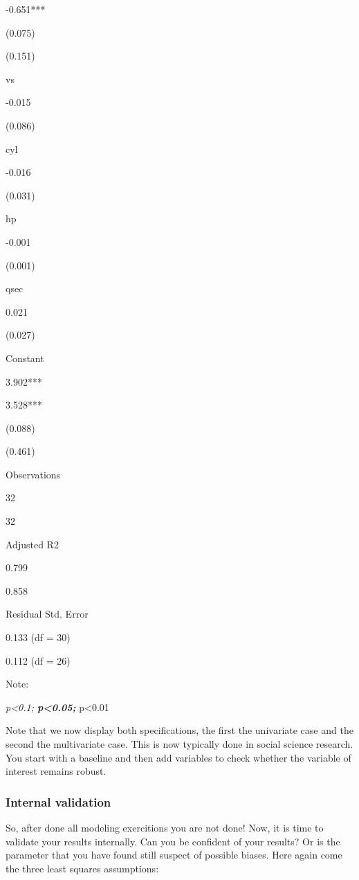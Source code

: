 \documentclass[]{article}
\begin{document}
-0.651***

(0.075)

(0.151)

vs

-0.015

(0.086)

cyl

-0.016

(0.031)

hp

-0.001

(0.001)

qsec

0.021

(0.027)

Constant

3.902***

3.528***

(0.088)

(0.461)

Observations

32

32

Adjusted R2

0.799

0.858

Residual Std. Error

0.133 (df = 30)

0.112 (df = 26)

Note:

\emph{p\textless{}0.1; \textbf{p\textless{}0.05; }}p\textless{}0.01

Note that we now display both specifications, the first the univariate
case and the second the multivariate case. This is now typically done in
social science research. You start with a baseline and then add
variables to check whether the variable of interest remains robust.

\subsubsection{Internal validation}\label{internal-validation}

So, after done all modeling exercitions you are not done! Now, it is
time to validate your results internally. Can you be confident of your
results? Or is the parameter that you have found still suspect of
possible biases. Here again come the three least squares assumptions:
\end{document}
